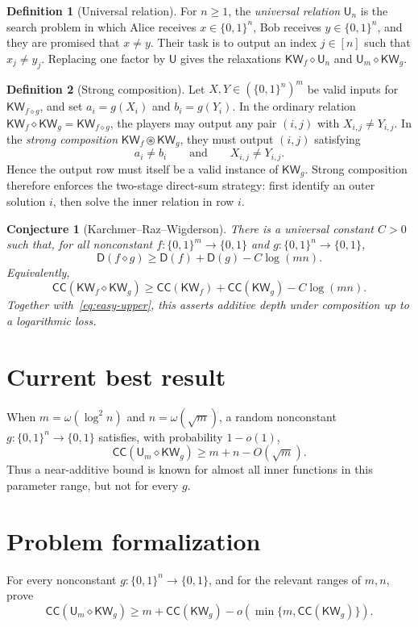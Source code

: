\documentclass[10pt,a4paper]{article}
\theoremstyle{definition}
\newtheorem{definition}{Definition}
\theoremstyle{plain}
\newtheorem{conjecture}{Conjecture}
\theoremstyle{definition}
\newcommand{\KW}{\mathsf{KW}}
\newcommand{\CC}{\mathsf{CC}}
\newcommand{\Depth}{\mathsf{D}}
\newcommand{\UR}{\mathsf{U}}
\begin{document}
\begin{definition}[Universal relation]
For $n\geq 1$, the \emph{universal relation} $\UR_n$ is the search problem in
which Alice receives $x\in\{0,1\}^n$, Bob receives $y\in\{0,1\}^n$, and they are
promised that $x\neq y$. Their task is to output an index $j\in[n]$ such that
$x_j\neq y_j$. Replacing one factor by $\UR$ gives the relaxations
$\KW_f\diamond\UR_n$ and $\UR_m\diamond\KW_g$.
\end{definition}

\begin{definition}[Strong composition]
Let $X,Y\in(\{0,1\}^n)^m$ be valid inputs for $\KW_{f\diamond g}$, and set
$a_i=g(X_i)$ and $b_i=g(Y_i)$. In the ordinary relation
$\KW_f\diamond\KW_g=\KW_{f\diamond g}$, the players may output any pair $(i,j)$
with $X_{i,j}\neq Y_{i,j}$. In the \emph{strong composition}
$\KW_f\circledast\KW_g$, they must output $(i,j)$ satisfying
\begin{equation}\label{eq:strong-def}
  a_i\neq b_i
  \qquad\text{and}\qquad
  X_{i,j}\neq Y_{i,j}.
\end{equation}
Hence the output row must itself be a valid instance of $\KW_g$. Strong composition
therefore enforces the two-stage direct-sum strategy: first identify an outer solution
$i$, then solve the inner relation in row $i$.
\end{definition}

\begin{conjecture}[Karchmer--Raz--Wigderson]\label{conj:krw}
There is a universal constant $C>0$ such that, for all nonconstant
$f:\{0,1\}^{m}\to\{0,1\}$ and $g:\{0,1\}^{n}\to\{0,1\}$,
\begin{equation}\label{eq:krw}
  \Depth(f\diamond g)
  \geq \Depth(f)+\Depth(g)-C\log(mn).
\end{equation}
Equivalently,
\begin{equation}\label{eq:krw-cc}
  \CC(\KW_f\diamond\KW_g)
  \geq \CC(\KW_f)+\CC(\KW_g)-C\log(mn).
\end{equation}
Together with~\eqref{eq:easy-upper}, this asserts additive depth under composition
up to a logarithmic loss.
\end{conjecture}

\section{Current best result}
When $m=\omega(\log^2 n)$ and $n=\omega(\sqrt m)$, a random nonconstant
$g:\{0,1\}^{n}\to\{0,1\}$ satisfies, with probability $1-o(1)$,
\begin{equation}
  \CC(\UR_m\diamond\KW_g)\geq m+n-O(\sqrt m).
\end{equation}
Thus a near-additive bound is known for almost all inner functions in this
parameter range, but not for every $g$.

\section{Problem formalization}

For every nonconstant $g:\{0,1\}^{n}\to\{0,1\}$, and for the relevant ranges
of $m,n$, prove
\begin{equation}
  \CC(\UR_m\diamond\KW_g)
  \geq m+\CC(\KW_g)
  -o\!\left(\min\{m,\CC(\KW_g)\}\right).
\end{equation}
\end{document}
